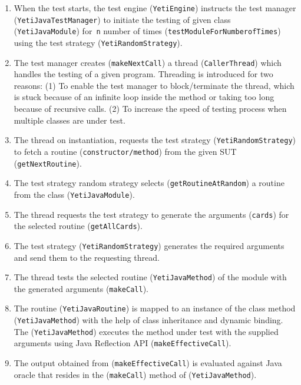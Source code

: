 \begin{enumerate}
\item When the test starts, the test engine (\verb+YetiEngine+) instructs the test manager (\verb+YetiJavaTestManager+) to initiate the testing of given class (\verb+YetiJavaModule+) for~\verb+n+ number of times (\verb+testModuleForNumberofTimes+) using the test strategy (\verb+YetiRandomStrategy+).

\item The test manager creates (\verb+makeNextCall+) a thread (\verb+CallerThread+) which handles the testing of a given program. Threading is introduced for two reasons: (1) To enable the test manager to block/terminate the thread, which is stuck because of an infinite loop inside the method or taking too long because of recursive calls. (2) To increase the speed of testing process when multiple classes are under test.

\item The thread on instantiation, requests the test strategy (\verb+YetiRandomStrategy+) to fetch a routine (\verb+constructor/method+) from the given SUT (\verb+getNextRoutine+).

\item The test strategy random strategy selects (\verb+getRoutineAtRandom+) a routine from the class (\verb+YetiJavaModule+).

\item The thread requests the test strategy to generate the arguments (\verb+cards+) for the selected routine (\verb+getAllCards+).

 \item The test strategy (\verb+YetiRandomStrategy+) generates the required arguments and send them to the requesting thread.
 
 \item The thread tests the selected routine (\verb+YetiJavaMethod+) of the module with the generated arguments (\verb+makeCall+).
 
 \item The routine (\verb+YetiJavaRoutine+) is mapped to an instance of the class method (\verb+YetiJavaMethod+) with the help of class inheritance and dynamic binding. The (\verb+YetiJavaMethod+) executes the method under test with the supplied arguments using Java Reflection API (\verb+makeEffectiveCall+).
 
\item The output obtained from (\verb+makeEffectiveCall+) is evaluated against Java oracle that resides in the (\verb+makeCall+) method of (\verb+YetiJavaMethod+).

\end{enumerate}



